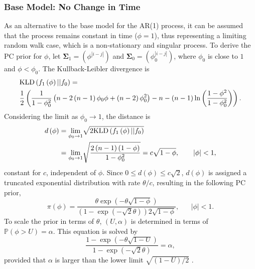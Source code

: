 \subsubsection*{Base Model: No Change in Time} 
As an alternative to the base model for the AR(1) process, it can be assumed that the process remains constant in time ($\phi = 1$), thus representing a limiting random walk case, which is a non-stationary and singular process. To derive the PC prior for $\phi$, let $\pmb{\Sigma}_1=\left(\phi^{|i-j|}\right)$ and $\pmb{\Sigma}_0=\left(\phi_0^{|i-j|}\right)$, where $\phi_0$ is close to $1$ and $\phi<\phi_0$. The Kullback-Leibler divergence is
\begin{align*}
    &\hbox{KLD}\left(f_1\left(\phi\right)||f_0\right)=\\
    &\frac{1}{2}\left(\frac{1}{1-\phi_0^2}\left(n-2\left(n-1\right)\phi_0\phi+\left(n-2\right)\phi_0^2\right)-n-\left(n-1\right)\ln\left(\frac{1-\phi^2}{1-\phi_0^2}\right)\right).
\end{align*}
Considering the limit as $\phi_0\rightarrow1$, the distance is
\begin{align*}
    d\left(\phi\right)&=\underset{\phi_0\rightarrow1}{\lim}\sqrt{2\hbox{KLD}\left(f_1\left(\phi\right)||f_0\right)} \\
    &=\underset{\phi_0\rightarrow1}{\lim}\sqrt{\frac{2\left(n-1\right)\left(1-\phi\right)}{1-\phi_0^2}} = c\sqrt{1-\phi}, \hspace{20pt}|\phi|<1,
\end{align*}
constant for $c$, independent of $\phi$. Since $0\leq d\left(\phi\right)\leq c\sqrt{2}$, $d\left(\phi\right)$ is assigned a truncated exponential distribution with rate $\theta/c$, resulting in the following PC prior,
\begin{equation}
    \pi\left(\phi\right)=\frac{\theta\exp\left(-\theta\sqrt{1-\phi}\right)}{\left(1-\exp\left(-\sqrt{2}\theta\right)\right)2\sqrt{1-\phi}}, \hspace{20pt}|\phi|<1.
\end{equation}
To scale the prior in terms of $\theta$, $\left(U,\alpha\right)$ is determined in terms of $\mathbb{P}\left(\phi>U\right)=\alpha$. This equation is solved by
\begin{equation*}
    \frac{1-\exp\left(-\theta\sqrt{1-U}\right)}{1-\exp\left(-\sqrt{2}\theta\right)}=\alpha,
\end{equation*}
provided that $\alpha$ is larger than the lower limit $\sqrt{\left(1-U\right)/2}$ \autocite[][]{sorbye2017penalised}.
\clearpage
